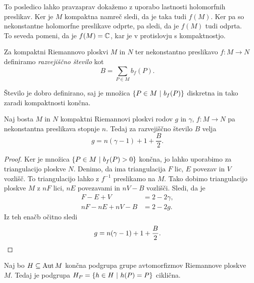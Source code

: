 To posledico lahko pravzaprav dokažemo z uporabo lastnosti
holomorfnih preslikav. Ker je $M$ kompaktna namreč sledi, da je
taka tudi $f(M)$. Ker pa so nekonstantne holomorfne preslikave
odprte, pa sledi, da je $f(M)$ tudi odprta. To seveda pomeni, da je
$f(M) = \mathbb{C}$, kar je v protislovju s kompaktnostjo.

\begin{definicija}
Za kompaktni Riemannovo ploskvi $M$ in $N$ ter nekonstantno
preslikavo $f \colon M \to N$ definiramo
\emph{razvejiščno število} kot
\[
B = \sum_{P \in M} b_f(P).
\]
\end{definicija}

Število je dobro definirano, saj je množica
$\left\{P \in M~\middle\vert~b_f(P)\right\}$ diskretna in tako zaradi kompaktnosti
končna.

\begin{izrek}
\label{iz:rie-hur}
Naj bosta $M$ in $N$ kompaktni Riemannovi ploskvi rodov $g$ in
$\gamma$, $f \colon M \to N$ pa nekonstantna preslikava stopnje
$n$. Tedaj za razvejiščno število $B$ velja
\[
g = n(\gamma - 1) + 1 + \frac{B}{2}.
\]
\end{izrek}

\begin{proof}
Ker je množica $\left\{P \in M~\middle\vert~b_f(P) > 0\right\}$ končna, jo lahko
uporabimo za triangulacijo ploskve $N$. Denimo, da ima
triangulacija $F$ lic, $E$ povezav in $V$ vozlišč. To
triangulacijo lahko z $f^{-1}$ preslikamo na $M$. Tako dobimo
triangulacijo ploskve $M$ z $nF$ lici, $nE$ povezavami in $nV - B$
vozlišči. Sledi, da je
\begin{align*}
F - E + V &= 2 - 2 \gamma,
\\
nF - nE + nV - B &= 2 - 2g.
\end{align*}
Iz teh enačb očitno sledi
\[
g = n(\gamma - 1) + 1 + \frac{B}{2}. \qedhere
\]
\end{proof}

\begin{trditev}
Naj bo $H \subseteq \operatorname{Aut} M$ končna podgrupa grupe avtomorfizmov
Riemannove ploskve $M$. Tedaj je podgrupa
$H_P = \left\{h \in H~\middle\vert~h(P) = P\right\}$ ciklična.
\end{trditev}

